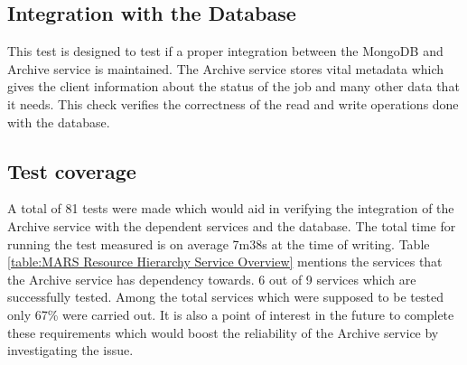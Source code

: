 \subsection{Integration with the Database}
This test is designed to test if a proper integration between the MongoDB and Archive service is maintained. The Archive service stores vital metadata
which gives the client information about the status of the job and many other data that it needs. This check verifies the correctness of the read and write 
operations done with the database. 

\subsection{Test coverage}
A total of 81 tests were made which would aid in verifying the integration of the Archive service with the dependent services and the database. The 
total time for running the test measured is on average 7m38s at the time of writing. Table \ref{table:MARS Resource Hierarchy Service Overview}
mentions the services that the Archive service has dependency towards. 6 out of 9 services which are successfully tested. Among the total services 
which were supposed to be tested only 67\%  were carried out. It is also a point of interest in the future to complete these requirements which would boost the
reliability of the Archive service by investigating the issue.  
